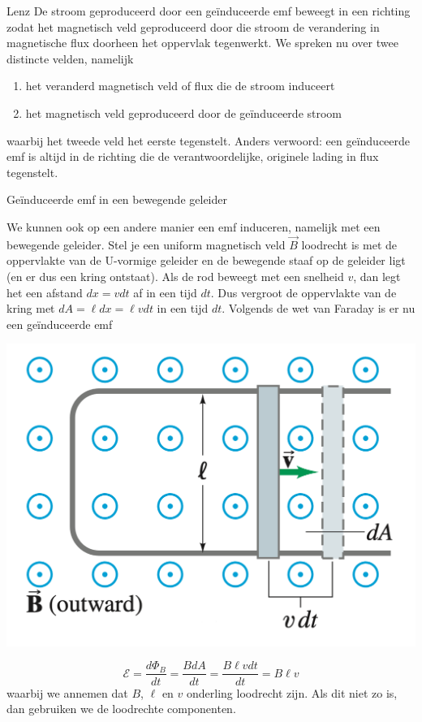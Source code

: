 \begin{lem}[Lenz]{Lenz}
    De stroom geproduceerd door een geïnduceerde emf beweegt in een richting zodat het magnetisch veld geproduceerd 
    door die stroom de verandering in magnetische flux doorheen het oppervlak tegenwerkt. We spreken nu over twee distincte velden, namelijk
    \begin{enumerate}
        \item het veranderd magnetisch veld of flux die de stroom induceert
        \item het magnetisch veld geproduceerd door de geïnduceerde stroom
    \end{enumerate}
    waarbij het tweede veld het eerste tegenstelt. Anders verwoord: een geïnduceerde emf is altijd in de richting
    die de verantwoordelijke, originele lading in flux tegenstelt.
\end{lem}

\begin{app}{Geïnduceerde emf in een bewegende geleider}
    \begin{minipage}{.69\textwidth}
        We kunnen ook op een andere manier een emf induceren, namelijk met een bewegende geleider. Stel je een uniform magnetisch veld
        $\Vec{B}$ loodrecht is met de oppervlakte van de U-vormige geleider en de bewegende staaf op de geleider ligt (en er dus een kring 
        ontstaat). Als de rod beweegt met een snelheid $v$, dan legt het een afstand $dx = vdt$ af in een tijd $dt$.  Dus vergroot de oppervlakte
        van de kring met $dA = \ell dx = \ell v dt$ in een tijd $dt$. Volgends de wet van Faraday is er nu een geïnduceerde emf
    \end{minipage}
    \begin{minipage}{.27\textwidth}
        \includegraphics[scale = 0.23]{Images/Magnetisme/BewegendeGeleider}
    \end{minipage}
        \begin{equation*}
            \mathcal{E} = \dfrac{d\Phi_{B}}{dt} = \dfrac{BdA}{dt} = \dfrac{B\ell v dt}{dt} = B \ell v
        \end{equation*}
    waarbij we annemen dat $B$, $\ell$ en $v$ onderling loodrecht zijn. Als dit niet zo is, dan gebruiken we de loodrechte componenten.
\end{app}

\newpage

